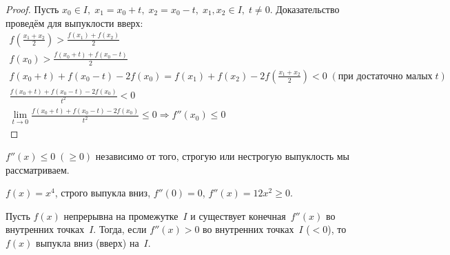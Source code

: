 \begin{proof}
Пусть \(x_0 \in I, \; x_1 = x_0 + t, \; x_2 = x_0 - t, \; x_1, x_2 \in I, \; t
\neq 0\). Доказательство проведём для выпуклости вверх:
\begin{gather}
    f\left(\frac{x_1 + x_2}{2}\right) > \frac{f(x_1) + f(x_2)}{2}\\
    f(x_0) > \frac{f(x_0 + t) + f(x_0 - t)}{2}\\
    f(x_0 + t) + f(x_0 - t) - 2f(x_0) = f(x_1) + f(x_2) -
        2f\left(\frac{x_1 + x_2}{2}\right) < 0 \; (\text{при достаточно малых}
        \; t)\\
    \frac{f(x_0 + t) + f(x_0 - t) - 2f(x_0)}{t^2} < 0\\
    \lim_{t \rightarrow 0}{\frac{f(x_0 + t) + f(x_0 - t) - 2f(x_0)}{t^2}} \leq 0
        \Rightarrow f''(x_0) \leq 0
\end{gather}
\end{proof}

\begin{note}
\(f''(x) \leq 0 \; (\geq 0)\) независимо от того, строгую или нестрогую
выпуклость мы рассматриваем.
\end{note}

\begin{example}
\(f(x) = x^4\), строго выпукла вниз, \(f''(0) = 0\), \(f''(x) = 12x^2 \geq 0\).
\end{example}

\begin{theorem}
Пусть \(f(x)\) непрерывна на промежутке~\(I\) и существует конечная~\(f''(x)\)
во внутренних точках~\(I\). Тогда, если \(f''(x) > 0\) во внутренних
точках~\(I\) (\(< 0\)), то \(f(x)\) выпукла вниз (вверх) на~\(I\).
\end{theorem}

